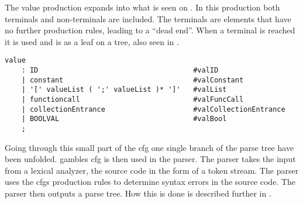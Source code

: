 The value production expands into what is seen on .
In this production both terminals and non-terminals are included.
The terminals are elements that have no further production rules, leading to a ``dead end''.
When a terminal is reached it is used and is as a leaf on a tree, also seen in .
\begin{lstlisting}[caption={\acrshort{cfg} Value},frame=tlrb,label={lst:value},numbers=none]
value
    : ID                                     #valID
    | constant                               #valConstant
    | '[' valueList ( ';' valueList )* ']'   #valList
    | functioncall                           #valFuncCall
    | collectionEntrance                     #valCollectionEntrance
    | BOOLVAL                                #valBool
    ;
\end{lstlisting}

Going through this small part of the \acrshort{cfg} one single branch of the parse tree have been unfolded.
\gls{gamble}s \acrshort{cfg} is then used in the parser.
The parser takes the input from a lexical analyzer, the source code in the form of a token stream.
The parser uses the \acrshort{cfg}s production rules to determine syntax errors in the source code.
The parser then outputs a parse tree.
How this is done is described further in .
